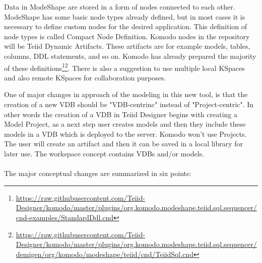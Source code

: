 \documentclass[12pt,oneside]{fithesis2}
\begin{document}
\par Data in ModeShape are stored in a form of nodes connected to each other.  ModeShape has some basic node types already defined, but in most cases it is necessary to define custom nodes for the desired application. This definition of node types is called Compact Node Definition. Komodo nodes in the repository will be Teiid Dynamic Artifacts. These artifacts are for example models, tables, columns, DDL statements, and so on. Komodo has already prepared the majority of these definitions\footnote{\url{https://raw.githubusercontent.com/Teiid-Designer/komodo/master/plugins/org.komodo.modeshape.teiid.sql.sequencer/cnd-examples/StandardDdl.cnd}}\footnote{\url{https://raw.githubusercontent.com/Teiid-Designer/komodo/master/plugins/org.komodo.modeshape.teiid.sql.sequencer/demigen/org/komodo/modeshape/teiid/cnd/TeiidSql.cnd}}. There is also a suggestion to use multiple local KSpaces and also remote KSpaces for collaboration purposes. 
\par One of major changes in approach of the modeling in this new tool, is that the creation of a new VDB should be "VDB-centrinc" instead of "Project-centric". In other words the creation of a VDB in Teiid Designer begins with creating a Model Project, as a next step user creates models and then they include these models in a VDB which is deployed to the server. Komodo won't use Projects. The user will create an artifact and then it can be saved in a local library for later use. The workspace concept contains VDBs and/or models.\\ \\
The major conceptual changes are summarized in six points\cite{Komodo}:
\end{document}
